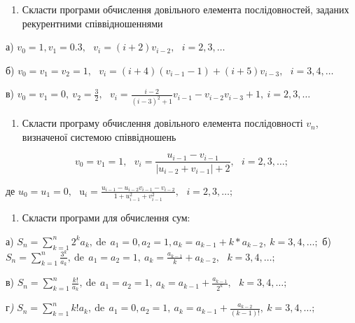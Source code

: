 \documentclass[]{article}
\begin{document}
\begin{enumerate}
\def\labelenumi{\arabic{enumi})}
\item
  Скласти програми обчислення довільного елемента послідовностей,
  заданих рекурентними співвідношеннями
\end{enumerate}

а)
\(v_{0} = 1,v_{1} = 0.3,\mathrm{\text{\ \ \ \ \ \ \ \ }}v_{i} = (i + 2)v_{i - 2},\mathrm{\text{\ \ \ }}i = 2,3,\ldots\)

б)
\(v_{0} = v_{1} = v_{2} = 1,\mathrm{\text{\ \ \ \ \ \ \ \ }}v_{i} = (i + 4)(v_{i - 1} - 1) + (i + 5)v_{i - 3},\mathrm{\text{\ \ }}i = 3,4,\ldots\)

в)
\(v_{0} = v_{1} = 0,\ v_{2} = \frac{3}{2}\mathrm{,\ \ \ }v_{i} = \frac{i - 2}{(i - 3)^{2} + 1}v_{i - 1} - v_{i - 2}v_{i - 3} + 1,\ i = 2,3,\ldots\)

\begin{enumerate}
\def\labelenumi{\arabic{enumi})}
\item
  Скласти програму обчислення довільного елемента послідовності
  \(v_{n}\), визначеної системою співвідношень
\end{enumerate}

\[v_{0} = v_{1} = 1,\mathrm{\text{\ \ \ \ }}v_{i} = \frac{u_{i - 1} - v_{i - 1}}{\left| u_{i - 2} + v_{i - 1} \right| + 2},\mathrm{\text{\ \ \ }}i = 2,3,\ldots;\]

де
\(u_{0} = u_{1} = 0,\mathrm{\text{\ \ \ \ }}\mathrm{u}_{i} = \frac{u_{i - 1} - u_{i - 2}v_{i - 1} - v_{i - 2}}{1 + u_{i - 1}^{2} + v_{i - 1}^{2}},\mathrm{\text{\ \ \ }}i = 2,3,\ldots;\)

\begin{enumerate}
\def\labelenumi{\arabic{enumi})}
\item
  Скласти програми для обчислення сум:
\end{enumerate}

а)
\(S_{n} = \sum_{k = 1}^{n}{2^{k}a_{k}},\mathrm{\ de\ \ }a_{1} = 0,a_{2} = 1,a_{k} = a_{k - 1} + k*a_{k - 2},\ k = 3,4,\ldots;\)
б)
\(S_{n} = \sum_{k = 1}^{n}\frac{3^{k}}{a_{k}},\mathrm{\ de\ \ }a_{1} = a_{2} = 1,\ a_{k} = \frac{a_{k - 1}}{k} + a_{k - 2},\mathrm{\text{\ \ }}k = 3,4,\ldots;\)

в)
\(S_{n} = \sum_{k = 1}^{n}\frac{k!}{a_{k}},\mathrm{\ de\ \ }a_{1} = a_{2} = 1,\ a_{k} = a_{k - 1} + \frac{a_{k - 1}}{2^{k}},\mathrm{\text{\ \ }}k = 3,4,\ldots;\)

г\emph{)}
\(S_{n} = \sum_{k = 1}^{n}{k!a_{k}},\mathrm{\ de\ \ }a_{1} = 0,a_{2} = 1,\ a_{k} = a_{k - 1} + \frac{a_{k - 2}}{(k - 1)!},\ k = 3,4,\ldots;\)
\end{document}
